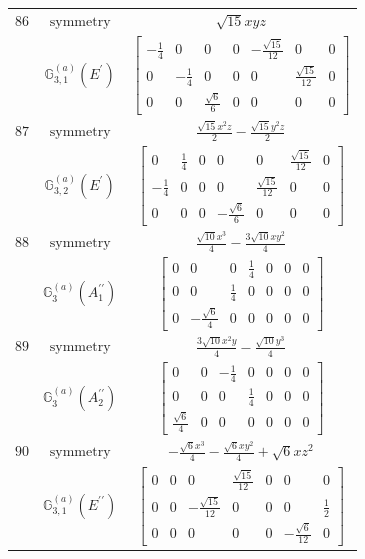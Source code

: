 \documentclass[fleqn,8pt,landscape]{jsarticle}
\begin{document}
\begin{longtable}{ccc}
$ 86 $ & $ \text{symmetry} $ & $ \sqrt{15} x y z $ \\
$  $ & $ \mathbb{G}_{3,1}^{(a)}(E^{\prime}) $ & $ \begin{bmatrix} - \frac{1}{4} & 0 & 0 & 0 & - \frac{\sqrt{15}}{12} & 0 & 0 \\ 0 & - \frac{1}{4} & 0 & 0 & 0 & \frac{\sqrt{15}}{12} & 0 \\ 0 & 0 & \frac{\sqrt{6}}{6} & 0 & 0 & 0 & 0 \end{bmatrix} $ \\ \hline
$ 87 $ & $ \text{symmetry} $ & $ \frac{\sqrt{15} x^{2} z}{2} - \frac{\sqrt{15} y^{2} z}{2} $ \\
$  $ & $ \mathbb{G}_{3,2}^{(a)}(E^{\prime}) $ & $ \begin{bmatrix} 0 & \frac{1}{4} & 0 & 0 & 0 & \frac{\sqrt{15}}{12} & 0 \\ - \frac{1}{4} & 0 & 0 & 0 & \frac{\sqrt{15}}{12} & 0 & 0 \\ 0 & 0 & 0 & - \frac{\sqrt{6}}{6} & 0 & 0 & 0 \end{bmatrix} $ \\ \hline
$ 88 $ & $ \text{symmetry} $ & $ \frac{\sqrt{10} x^{3}}{4} - \frac{3 \sqrt{10} x y^{2}}{4} $ \\
$  $ & $ \mathbb{G}_{3}^{(a)}(A_{1}^{\prime\prime}) $ & $ \begin{bmatrix} 0 & 0 & 0 & \frac{1}{4} & 0 & 0 & 0 \\ 0 & 0 & \frac{1}{4} & 0 & 0 & 0 & 0 \\ 0 & - \frac{\sqrt{6}}{4} & 0 & 0 & 0 & 0 & 0 \end{bmatrix} $ \\ \hline
$ 89 $ & $ \text{symmetry} $ & $ \frac{3 \sqrt{10} x^{2} y}{4} - \frac{\sqrt{10} y^{3}}{4} $ \\
$  $ & $ \mathbb{G}_{3}^{(a)}(A_{2}^{\prime\prime}) $ & $ \begin{bmatrix} 0 & 0 & - \frac{1}{4} & 0 & 0 & 0 & 0 \\ 0 & 0 & 0 & \frac{1}{4} & 0 & 0 & 0 \\ \frac{\sqrt{6}}{4} & 0 & 0 & 0 & 0 & 0 & 0 \end{bmatrix} $ \\ \hline
$ 90 $ & $ \text{symmetry} $ & $ - \frac{\sqrt{6} x^{3}}{4} - \frac{\sqrt{6} x y^{2}}{4} + \sqrt{6} x z^{2} $ \\
$  $ & $ \mathbb{G}_{3,1}^{(a)}(E^{\prime\prime}) $ & $ \begin{bmatrix} 0 & 0 & 0 & \frac{\sqrt{15}}{12} & 0 & 0 & 0 \\ 0 & 0 & - \frac{\sqrt{15}}{12} & 0 & 0 & 0 & \frac{1}{2} \\ 0 & 0 & 0 & 0 & 0 & - \frac{\sqrt{6}}{12} & 0 \end{bmatrix} $ \\ \hline

\end{longtable}
\end{document}
